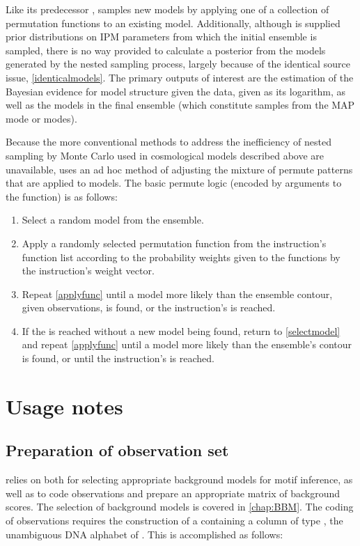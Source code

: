 Like its predecessor ,  samples new models by applying one of a collection of permutation functions to an existing model. Additionally, although  is supplied prior distributions on IPM parameters from which the initial ensemble is sampled, there is no way provided to calculate a posterior from the models generated by the nested sampling process, largely because of the identical source issue, \ref{identicalmodels}. The primary outputs of interest are the estimation of the Bayesian evidence for model structure given the data, given as its logarithm, as well as the models in the final ensemble (which constitute samples from the MAP mode or modes).

Because the more conventional methods to address the inefficiency of nested sampling by Monte Carlo used in cosmological models described above are unavailable,  uses an ad hoc method of adjusting the mixture of permute patterns that are applied to models. The basic permute logic (encoded by  arguments to the  function) is as follows:

\begin{enumerate}
    \item\label{selectmodel} Select a random  model from the ensemble.
    \item\label{applyfunc} Apply a randomly selected permutation function from the instruction's function list according to the probability weights given to the functions by the instruction's weight vector.
    \item Repeat \ref{applyfunc} until a model more likely than the ensemble contour, given observations, is found, or the instruction's  is reached.
    \item If the  is reached without a new model being found, return to \ref{selectmodel} and repeat \ref{applyfunc} until a model more likely than the ensemble's contour is found, or until the instruction's  is reached.
\end{enumerate}

\section{Usage notes}
\subsection{Preparation of observation set}
 relies on  both for selecting appropriate background models for motif inference, as well as to code observations and prepare an appropriate matrix of background scores. The selection of background models is covered in \autoref{chap:BBM}. The coding of observations requires the construction of a  containing a column of type , the unambiguous DNA alphabet of . This is accomplished as follows:

